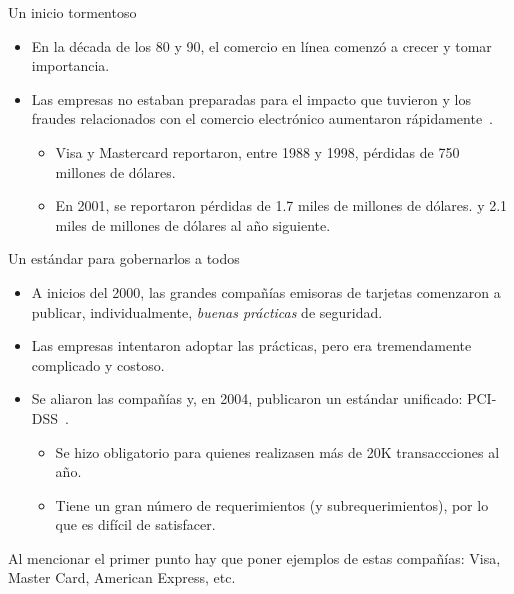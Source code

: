 %
%
%


\begin{frame}{Un inicio tormentoso}
  \begin{itemize}
    \item En la década de los 80 y 90, el comercio en línea comenzó a crecer y
      tomar importancia.
    \item Las empresas no estaban preparadas para el impacto que tuvieron y
      los fraudes relacionados con el comercio electrónico aumentaron
      rápidamente~\cite{search_security}.
      \begin{itemize}
        \item Visa y Mastercard reportaron, entre 1988 y 1998, pérdidas de 750
          millones de dólares.
        \item En 2001, se reportaron pérdidas de 1.7 miles de millones de
          dólares. y  2.1 miles de millones de dólares al año siguiente.
      \end{itemize}
  \end{itemize}
\end{frame}

\begin{frame}{Un estándar para gobernarlos a todos}
  \begin{itemize}
    \item A inicios del 2000, las grandes compañías emisoras de tarjetas
      comenzaron a publicar, individualmente, \textit{buenas prácticas} de
      seguridad.
    \item Las empresas intentaron adoptar las prácticas, pero era tremendamente
      complicado y costoso.
    \item Se aliaron las compañías y, en 2004, publicaron un estándar unificado:
      PCI-DSS\footnotemark~\cite{pci_dss}.
      \begin{itemize}
        \item Se hizo obligatorio para quienes realizasen más de 20K
          transaccciones al año.
        \item Tiene un gran número de requerimientos (y subrequerimientos), por
          lo que es difícil de satisfacer.
      \end{itemize}
  \end{itemize}

  \note
  {
    Al mencionar el primer punto hay que poner ejemplos de estas compañías:
    Visa, Master Card, American Express, etc.
  }

\end{frame}

